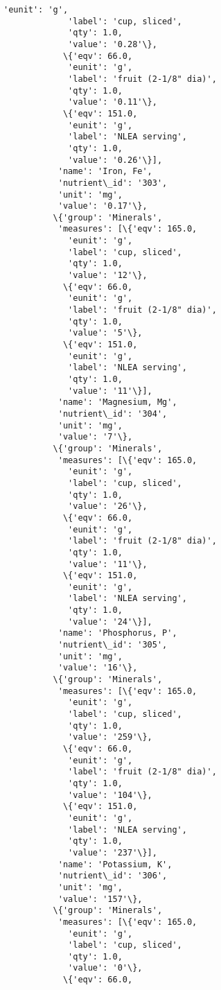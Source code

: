 \documentclass[11pt]{article}
\begin{document}
\begin{Verbatim}[commandchars=\\\{\}]
             'eunit': 'g',
             'label': 'cup, sliced',
             'qty': 1.0,
             'value': '0.28'\},
            \{'eqv': 66.0,
             'eunit': 'g',
             'label': 'fruit (2-1/8" dia)',
             'qty': 1.0,
             'value': '0.11'\},
            \{'eqv': 151.0,
             'eunit': 'g',
             'label': 'NLEA serving',
             'qty': 1.0,
             'value': '0.26'\}],
           'name': 'Iron, Fe',
           'nutrient\_id': '303',
           'unit': 'mg',
           'value': '0.17'\},
          \{'group': 'Minerals',
           'measures': [\{'eqv': 165.0,
             'eunit': 'g',
             'label': 'cup, sliced',
             'qty': 1.0,
             'value': '12'\},
            \{'eqv': 66.0,
             'eunit': 'g',
             'label': 'fruit (2-1/8" dia)',
             'qty': 1.0,
             'value': '5'\},
            \{'eqv': 151.0,
             'eunit': 'g',
             'label': 'NLEA serving',
             'qty': 1.0,
             'value': '11'\}],
           'name': 'Magnesium, Mg',
           'nutrient\_id': '304',
           'unit': 'mg',
           'value': '7'\},
          \{'group': 'Minerals',
           'measures': [\{'eqv': 165.0,
             'eunit': 'g',
             'label': 'cup, sliced',
             'qty': 1.0,
             'value': '26'\},
            \{'eqv': 66.0,
             'eunit': 'g',
             'label': 'fruit (2-1/8" dia)',
             'qty': 1.0,
             'value': '11'\},
            \{'eqv': 151.0,
             'eunit': 'g',
             'label': 'NLEA serving',
             'qty': 1.0,
             'value': '24'\}],
           'name': 'Phosphorus, P',
           'nutrient\_id': '305',
           'unit': 'mg',
           'value': '16'\},
          \{'group': 'Minerals',
           'measures': [\{'eqv': 165.0,
             'eunit': 'g',
             'label': 'cup, sliced',
             'qty': 1.0,
             'value': '259'\},
            \{'eqv': 66.0,
             'eunit': 'g',
             'label': 'fruit (2-1/8" dia)',
             'qty': 1.0,
             'value': '104'\},
            \{'eqv': 151.0,
             'eunit': 'g',
             'label': 'NLEA serving',
             'qty': 1.0,
             'value': '237'\}],
           'name': 'Potassium, K',
           'nutrient\_id': '306',
           'unit': 'mg',
           'value': '157'\},
          \{'group': 'Minerals',
           'measures': [\{'eqv': 165.0,
             'eunit': 'g',
             'label': 'cup, sliced',
             'qty': 1.0,
             'value': '0'\},
            \{'eqv': 66.0,

\end{Verbatim}
\end{document}
